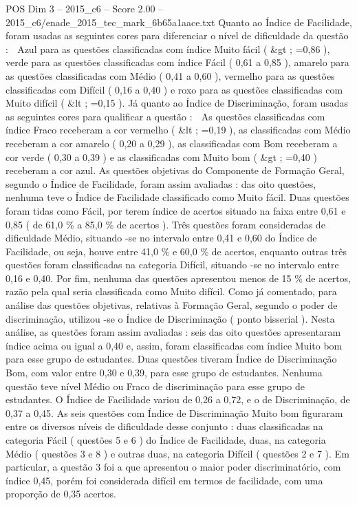 \begin{textsample}{POS Dim 3 – 2015\_c6 – Score 2.00 – 2015\_c6/enade\_2015\_tec\_mark\_6b65a1aace.txt}
Quanto ao Índice de Facilidade, foram usadas as seguintes cores para diferenciar o nível de dificuldade da questão :  Azul para as questões classificadas com índice Muito fácil ( \&gt ; =0,86 ), verde para as questões classificadas com índice Fácil ( 0,61 a 0,85 ), amarelo para as questões classificadas com Médio ( 0,41 a 0,60 ), vermelho para as questões classificadas com Difícil ( 0,16 a 0,40 ) e roxo para as questões classificadas com Muito difícil ( \&lt ; =0,15 ).
Já quanto ao Índice de Discriminação, foram usadas as seguintes cores para qualificar a questão :  As questões classificadas com índice Fraco receberam a cor vermelho ( \&lt ; =0,19 ), as classificadas com Médio receberam a cor amarelo ( 0,20 a 0,29 ), as classificadas com Bom receberam a cor verde ( 0,30 a 0,39 ) e as classificadas com Muito bom ( \&gt ; =0,40 ) receberam a cor azul.
As questões objetivas do Componente de Formação Geral, segundo o Índice de Facilidade, foram assim avaliadas : das oito questões, nenhuma teve o Índice de Facilidade classificado como Muito fácil.
Duas questões foram tidas como Fácil, por terem índice de acertos situado na faixa entre 0,61 e 0,85 ( de 61,0 \% a 85,0 \% de acertos ).
Três questões foram consideradas de dificuldade Médio, situando -se no intervalo entre 0,41 e 0,60 do Índice de Facilidade, ou seja, houve entre 41,0 \% e 60,0 \% de acertos, enquanto outras três questões foram classificadas na categoria Difícil, situando -se no intervalo entre 0,16 e 0,40.
Por fim, nenhuma das questões apresentou menos de 15 \% de acertos, razão pela qual seria classificada como Muito difícil.
Como já comentado, para análise das questões objetivas, relativas à Formação Geral, segundo o poder de discriminação, utilizou -se o Índice de Discriminação ( ponto bisserial ).
Nesta análise, as questões foram assim avaliadas : seis das oito questões apresentaram índice acima ou igual a 0,40 e, assim, foram classificadas com índice Muito bom para esse grupo de estudantes.
Duas questões tiveram Índice de Discriminação Bom, com valor entre 0,30 e 0,39, para esse grupo de estudantes.
Nenhuma questão teve nível Médio ou Fraco de discriminação para esse grupo de estudantes.
O Índice de Facilidade variou de 0,26 a 0,72, e o de Discriminação, de 0,37 a 0,45.
As seis questões com Índice de Discriminação Muito bom figuraram entre os diversos níveis de dificuldade desse conjunto : duas classificadas na categoria Fácil ( questões 5 e 6 ) do Índice de Facilidade, duas, na categoria Médio ( questões 3 e 8 ) e outras duas, na categoria Difícil ( questões 2 e 7 ).
Em particular, a questão 3 foi a que apresentou o maior poder discriminatório, com índice 0,45, porém foi considerada difícil em termos de facilidade, com uma proporção de 0,35 acertos.

\end{textsample}
